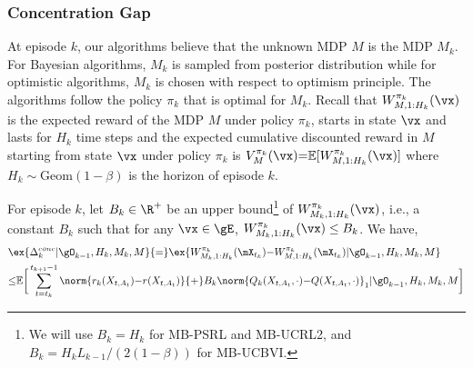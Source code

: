 \subsubsection{Concentration Gap}

At episode $k$, our algorithms believe that the unknown MDP $M$ is the MDP $M_k$.
For Bayesian algorithms, $M_k$ is sampled from posterior distribution while for optimistic algorithms, $M_k$ is chosen with respect to optimism principle.
The algorithms follow the policy $\pi_k$ that is optimal for $M_k$.
Recall that $W^{\pi_k}_{M,1:H_k}(\vx)$ is the expected reward of the MDP $M$ under policy $\pi_k$, starts in state $\vx$ and lasts for $H_k$ time steps and the expected cumulative discounted reward in $M$ starting from state $\vx$ under policy $\pi_k$ is $V_{M}^{\pi_k}(\vx){=}\mathbb{E}[W^{\pi_k}_{M, 1:H_k}(\vx)]$ where $H_k\sim \mathrm{Geom}(1-\beta)$ is the horizon of episode $k$.

\begin{lem}
    \label{lem:regret_decomposition}
    For episode $k$, let $B_k\in\R^+$ be an upper bound\footnote{We will use $B_k=H_k$ for MB-PSRL and MB-UCRL2, and $B_k=H_kL_{k-1}/(2(1-\beta))$ for MB-UCBVI.} of $W_{M_k,1:H_k}^{\pi_k}(\vx)$, i.e., a constant $B_k$ such that for any $\vx\in\gE$, $W_{M_k,1:H_k}^{\pi_k}(\vx)\le B_k$. We have,
    \begin{align}
        \label{eq:lem_decompo}
        &\ex{ \Delta_k^{conc} {\mid} \gO_{k-1}, H_k, M_k, M} {=} \ex{ W_{M_k,1:H_k}^{\pi_k}(\mX_{t_k}){-}W_{M,1:H_k}^{\pi_k}(\mX_{t_k}) {\mid} \gO_{k-1}, H_k, M_k, M}\nonumber \\
        &{\le}\mathbb{E}\bigg[\sum_{t=t_k}^{t_{k+1}-1}\norm{r_k(X_{t,A_t}){-}r(X_{t,A_t})}
        {+}B_k\norm{Q_{k}(X_{t,A_t},\cdot){-}Q(X_{t,A_t},\cdot)}_1 {\mid} \gO_{k-1}, H_k, M_k, M\bigg]
    \end{align}
\end{lem}

